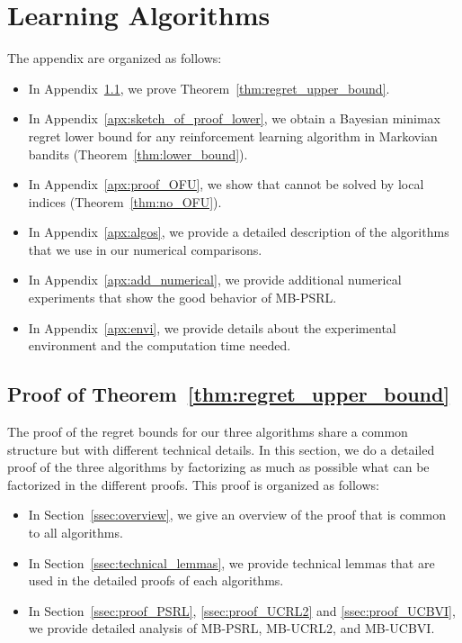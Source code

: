 \begingroup

\let\clearpage\relax
\chapter{Learning Algorithms}
\label{chp:apx_learning}

The appendix are organized as follows:
\begin{itemize}
    \item In Appendix~\ref{apx:proof_thm1}, we prove Theorem~\ref{thm:regret_upper_bound}. 
    \item In Appendix~\ref{apx:sketch_of_proof_lower}, we obtain a Bayesian minimax regret lower bound for any reinforcement learning algorithm in Markovian bandits (Theorem~\ref{thm:lower_bound}).
    \item In Appendix~\ref{apx:proof_OFU}, we show that  cannot be solved by local indices (Theorem~\ref{thm:no_OFU}).
    \item In Appendix~\ref{apx:algos}, we provide a detailed description of the algorithms that we use in our numerical comparisons. 
    \item In Appendix~\ref{apx:add_numerical}, we provide additional numerical experiments that show the good behavior of MB-PSRL. 
    \item In Appendix~\ref{apx:envi}, we provide details about the experimental environment and the computation time needed. 
\end{itemize}

\section{Proof of Theorem~\ref{thm:regret_upper_bound}}
\label{apx:proof_thm1}

The proof of the regret bounds for our three algorithms share a common structure but with different technical details.  In this section, we do a detailed proof of the three algorithms by factorizing as much as possible what can be factorized in the different proofs. This proof is organized as follows:
\begin{itemize}
    \item In Section~\ref{ssec:overview}, we give an overview of the proof that is common to all algorithms. 
    \item In Section~\ref{ssec:technical_lemmas}, we provide technical lemmas that are used in the detailed proofs of each algorithms. 
    \item In Section~\ref{ssec:proof_PSRL}, \ref{ssec:proof_UCRL2} and \ref{ssec:proof_UCBVI}, we provide detailed analysis of MB-PSRL, MB-UCRL2, and MB-UCBVI. 
\end{itemize}

